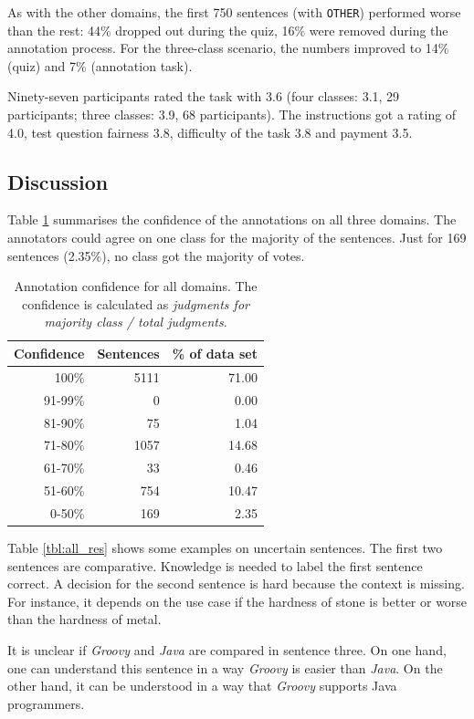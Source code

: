 As with the other domains, the first 750 sentences (with \texttt{OTHER}) performed worse than the rest: 44\% dropped out during the quiz, 16\% were removed during the annotation process. For the three-class scenario, the numbers improved to 14\% (quiz) and 7\% (annotation task).

Ninety-seven participants rated the task with 3.6 (four classes: 3.1, 29 participants; three classes: 3.9, 68 participants). The instructions got a rating of 4.0, test question fairness 3.8, difficulty of the task 3.8 and payment 3.5.


\subsection{Discussion}
Table \ref{fig:all_agg} summarises the confidence of the annotations on all three domains. The annotators could agree on one class for the majority of the sentences. Just for 169 sentences (2.35\%), no class got the majority of votes. 

\begin{table}[hp]
\caption{Annotation confidence for all domains. The confidence is calculated as \emph{judgments for majority class / total judgments}.}
\label{fig:all_agg}
\centering
\begin{tabular}{@{}rrr@{}}
\toprule
Confidence & Sentences & \% of data set \\
\midrule
100\%	&	5111	&	71.00	 \\ 
91-99\%	&	0	&	0.00	 \\ 
81-90\%	&	75	&	1.04	 \\ 
71-80\%	&	1057	&	14.68	 \\ 
61-70\%	&	33	&	0.46	 \\ 
51-60\%	&	754	&	10.47	 \\ 
0-50\%	&	169	&	2.35	 \\ 
\bottomrule
\end{tabular}
\end{table}

Table \ref{tbl:all_res} shows some examples on uncertain sentences. The first two sentences are comparative. Knowledge is needed to label the first sentence correct. A decision for the second sentence is hard because the context is missing. For instance, it depends on the use case if the hardness of stone is better or worse than the hardness of metal.

It is unclear if \emph{Groovy} and \emph{Java} are compared in sentence three. On one hand, one can understand this sentence in a way \emph{Groovy} is easier than \emph{Java}. On the other hand, it can be understood in a way that \emph{Groovy} supports Java programmers.

